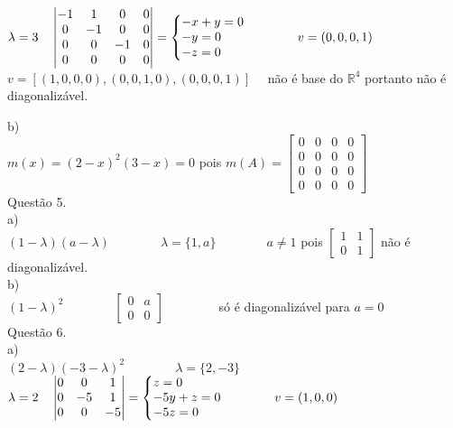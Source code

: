 \documentclass[12pt]{article}
\begin{document}
$\lambda=3\quad\begin{vmatrix}-1&1&0&0\\0&-1&0&0\\0&0&-1&0\\0&0&0&0\end{vmatrix}=\left\{\begin{array}{@{}l@{}}-x+y=0\\-y=0\\-z=0\end{array}\right.\qquad\qquad v=(0,0,0,1)$\\

$v=[(1,0,0,0),(0,0,1,0),(0,0,0,1)]\quad$ não é base do $\mathds{R}^{4}$ portanto não é diagonalizável.

\noindent b)\\

$m(x)=(2-x)^{2}(3-x)=0$ pois $m(A)=\begin{bmatrix}0&0&0&0\\0&0&0&0\\0&0&0&0\\0&0&0&0\end{bmatrix}$\\

\noindent Questão 5.\\

\noindent a)\\

$(1-\lambda)(a-\lambda)\qquad\qquad\lambda=\lbrace1,a\rbrace\qquad\qquad a\neq1$ pois $\begin{bmatrix}1&1\\0&1\end{bmatrix}$ não é diagonalizável.\\

\noindent b)\\

$(1-\lambda)^{2}\qquad\qquad\begin{bmatrix}0&a\\0&0\end{bmatrix}\qquad\qquad$ só é diagonalizável para $a=0$\\

\noindent Questão 6.\\

\noindent a)\\

$(2-\lambda)(-3-\lambda)^{2}\qquad\qquad \lambda=\lbrace2,-3\rbrace$\\

$\lambda=2\quad\begin{vmatrix}0&0&1\\0&-5&1\\0&0&-5\end{vmatrix}=\left\{\begin{array}{@{}l@{}}z=0\\-5y+z=0\\-5z=0\end{array}\right.\qquad\qquad v=(1,0,0)$\\
\end{document}

